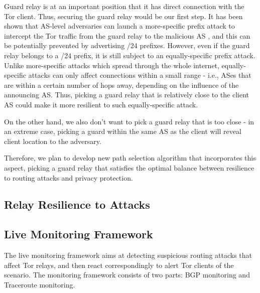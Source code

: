 \documentclass{acm_proc_article-sp}
\begin{document}
Guard relay is at an important position that it has direct connection with the Tor client. Thus, securing the guard relay would be our first step. It has been shown that AS-level adversaries can launch a more-specific prefix attack to intercept the Tor traffic from the guard relay to the malicious AS \cite{sun2015raptor}, and this can be potentially prevented by advertising /24 prefixes. However, even if the guard relay belongs to a /24 prefix, it is still subject to an equally-specific prefix attack. Unlike more-specific attacks which spread through the whole internet, equally-specific attacks can only affect connections within a small range - i.e., ASes that are within a certain number of hops away, depending on the influence of the announcing AS. Thus, picking a guard relay that is relatively close to the client AS could make it more resilient to such equally-specific attack.

On the other hand, we also don't want to pick a guard relay that is too close - in an extreme case, picking a guard within the same AS as the client will reveal client location to the adversary. 

Therefore, we plan to develop new path selection algorithm that incorporates this aspect, picking a guard relay that satisfies the optimal balance between resilience to routing attacks and privacy protection. 

\subsection{Relay Resilience to Attacks}

\subsection{Live Monitoring Framework}

The live monitoring framework aims at detecting suspicious routing attacks that affect Tor relays, and then react correspondingly to alert Tor clients of the scenario. The monitoring framework consists of two parts: BGP monitoring and Traceroute monitoring.
\end{document}

